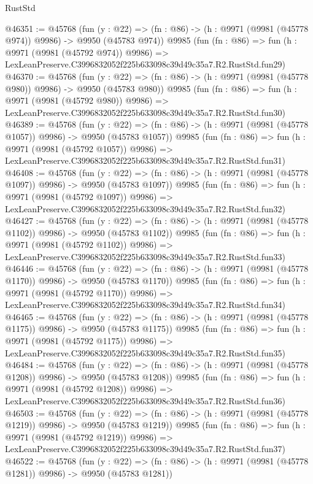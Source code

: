 \begin{lexlean}{RustStd}
\begin{coremodule}
@46351 := @45768
    (fun (y : @22) => (fn : @86) -> (h : @9971 (@9981 (@45778 @974)) @9986) -> @9950 (@45783 @974))
    @9985
    (fun (fn : @86) =>
    fun (h : @9971 (@9981 (@45792 @974)) @9986) =>
    LexLeanPreserve.C3996832052f225b633098c39d49c35a7.R2.RustStd.fun29)
@46370 := @45768
    (fun (y : @22) => (fn : @86) -> (h : @9971 (@9981 (@45778 @980)) @9986) -> @9950 (@45783 @980))
    @9985
    (fun (fn : @86) =>
    fun (h : @9971 (@9981 (@45792 @980)) @9986) =>
    LexLeanPreserve.C3996832052f225b633098c39d49c35a7.R2.RustStd.fun30)
@46389 := @45768
    (fun (y : @22) =>
    (fn : @86) -> (h : @9971 (@9981 (@45778 @1057)) @9986) -> @9950 (@45783 @1057))
    @9985
    (fun (fn : @86) =>
    fun (h : @9971 (@9981 (@45792 @1057)) @9986) =>
    LexLeanPreserve.C3996832052f225b633098c39d49c35a7.R2.RustStd.fun31)
@46408 := @45768
    (fun (y : @22) =>
    (fn : @86) -> (h : @9971 (@9981 (@45778 @1097)) @9986) -> @9950 (@45783 @1097))
    @9985
    (fun (fn : @86) =>
    fun (h : @9971 (@9981 (@45792 @1097)) @9986) =>
    LexLeanPreserve.C3996832052f225b633098c39d49c35a7.R2.RustStd.fun32)
@46427 := @45768
    (fun (y : @22) =>
    (fn : @86) -> (h : @9971 (@9981 (@45778 @1102)) @9986) -> @9950 (@45783 @1102))
    @9985
    (fun (fn : @86) =>
    fun (h : @9971 (@9981 (@45792 @1102)) @9986) =>
    LexLeanPreserve.C3996832052f225b633098c39d49c35a7.R2.RustStd.fun33)
@46446 := @45768
    (fun (y : @22) =>
    (fn : @86) -> (h : @9971 (@9981 (@45778 @1170)) @9986) -> @9950 (@45783 @1170))
    @9985
    (fun (fn : @86) =>
    fun (h : @9971 (@9981 (@45792 @1170)) @9986) =>
    LexLeanPreserve.C3996832052f225b633098c39d49c35a7.R2.RustStd.fun34)
@46465 := @45768
    (fun (y : @22) =>
    (fn : @86) -> (h : @9971 (@9981 (@45778 @1175)) @9986) -> @9950 (@45783 @1175))
    @9985
    (fun (fn : @86) =>
    fun (h : @9971 (@9981 (@45792 @1175)) @9986) =>
    LexLeanPreserve.C3996832052f225b633098c39d49c35a7.R2.RustStd.fun35)
@46484 := @45768
    (fun (y : @22) =>
    (fn : @86) -> (h : @9971 (@9981 (@45778 @1208)) @9986) -> @9950 (@45783 @1208))
    @9985
    (fun (fn : @86) =>
    fun (h : @9971 (@9981 (@45792 @1208)) @9986) =>
    LexLeanPreserve.C3996832052f225b633098c39d49c35a7.R2.RustStd.fun36)
@46503 := @45768
    (fun (y : @22) =>
    (fn : @86) -> (h : @9971 (@9981 (@45778 @1219)) @9986) -> @9950 (@45783 @1219))
    @9985
    (fun (fn : @86) =>
    fun (h : @9971 (@9981 (@45792 @1219)) @9986) =>
    LexLeanPreserve.C3996832052f225b633098c39d49c35a7.R2.RustStd.fun37)
@46522 := @45768
    (fun (y : @22) =>
    (fn : @86) -> (h : @9971 (@9981 (@45778 @1281)) @9986) -> @9950 (@45783 @1281))

\end{coremodule}
\end{lexlean}
